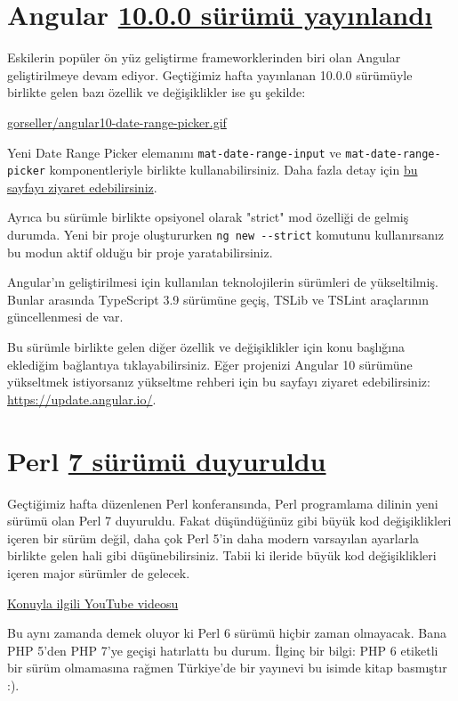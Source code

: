 \documentclass[11pt]{article}
\begin{document}
\section{Angular \href{https://blog.angular.io/version-10-of-angular-now-available-78960babd41}{10.0.0 sürümü yayınlandı}}
\label{sec:org179058b}
Eskilerin popüler ön yüz geliştirme frameworklerinden biri olan Angular
geliştirilmeye devam ediyor. Geçtiğimiz hafta yayınlanan 10.0.0 sürümüyle
birlikte gelen bazı özellik ve değişiklikler ise şu şekilde:

\url{gorseller/angular10-date-range-picker.gif}

Yeni Date Range Picker elemanını \texttt{mat-date-range-input} ve
\texttt{mat-date-range-picker} komponentleriyle birlikte kullanabilirsiniz. Daha
fazla detay için \href{https://next.material.angular.io/components/datepicker/overview\#date-range-selection}{bu sayfayı ziyaret edebilirsiniz}.

Ayrıca bu sürümle birlikte opsiyonel olarak "strict" mod özelliği de gelmiş
durumda. Yeni bir proje oluştururken \texttt{ng new -{}-strict} komutunu kullanırsanız
bu modun aktif olduğu bir proje yaratabilirsiniz.

Angular'ın geliştirilmesi için kullanılan teknolojilerin sürümleri
de yükseltilmiş. Bunlar arasında TypeScript 3.9 sürümüne geçiş, TSLib ve
TSLint araçlarının güncellenmesi de var.

Bu sürümle birlikte gelen diğer özellik ve değişiklikler için konu başlığına
eklediğim bağlantıya tıklayabilirsiniz. Eğer projenizi Angular 10 sürümüne
yükseltmek istiyorsanız yükseltme rehberi için bu sayfayı ziyaret
edebilirsiniz: \url{https://update.angular.io/}.
\section{Perl \href{https://www.perl.com/article/announcing-perl-7/}{7 sürümü duyuruldu}}
\label{sec:orgbaa4a03}
Geçtiğimiz hafta düzenlenen Perl konferansında, Perl programlama dilinin yeni
sürümü olan Perl 7 duyuruldu. Fakat düşündüğünüz gibi büyük kod değişiklikleri
içeren bir sürüm değil, daha çok Perl 5'in daha modern varsayılan ayarlarla
birlikte gelen hali gibi düşünebilirsiniz. Tabii ki ileride büyük kod
değişiklikleri içeren major sürümler de gelecek.

\href{https://www.youtube.com/watch?v=6wPMh-3qYJM}{Konuyla ilgili YouTube videosu}

Bu aynı zamanda demek oluyor ki Perl 6 sürümü hiçbir zaman olmayacak. Bana PHP
5'den PHP 7'ye geçişi hatırlattı bu durum. İlginç bir bilgi: PHP 6 etiketli
bir sürüm olmamasına rağmen Türkiye'de bir yayınevi bu isimde kitap basmıştır
:).
\end{document}
